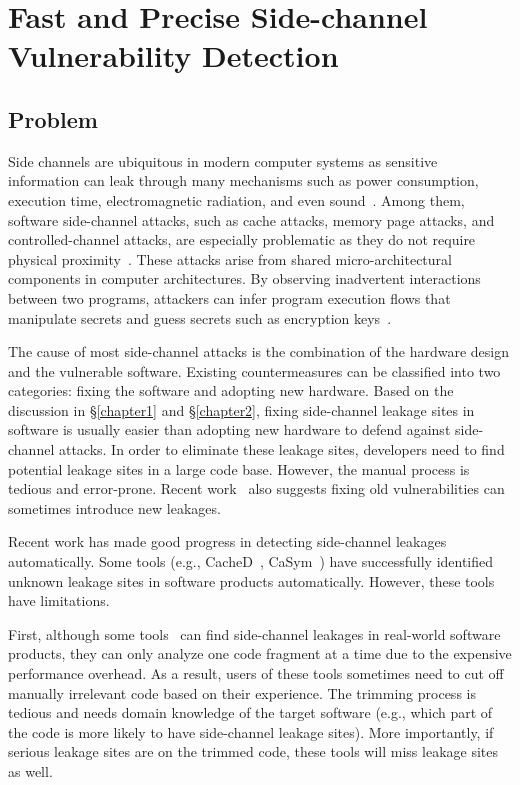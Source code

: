 
\chapter{Fast and Precise Side-channel Vulnerability Detection}\label{chapter3}
\section{Problem}
Side channels are ubiquitous in modern computer systems as sensitive information can leak through many mechanisms such as power consumption, execution time, electromagnetic radiation, and even sound~\cite{agrawal2002side,kar20178,chari1999towards,217605,genkin2014rsa}.  Among them, software side-channel attacks, such as cache attacks, memory page attacks, and controlled-channel attacks, are especially problematic as they do not require physical proximity~\cite{7163052,217543,217589,lee2017inferring,191010,liu2015last}. These attacks arise from shared micro-architectural components in computer architectures. By observing inadvertent interactions between two programs, attackers can infer program execution flows that manipulate secrets and guess secrets such as encryption keys~\cite{Osvik2006,Gullasch:2011:CGB:2006077.2006784,203878,10.1007/978-3-540-45238-6_6}.

The cause of most side-channel attacks is the combination of the hardware design and the vulnerable software. Existing countermeasures can be classified into two categories: fixing the software and adopting new hardware. Based on the discussion in \S\ref{chapter1} and \S\ref{chapter2}, fixing side-channel leakage sites in software is usually easier than adopting new hardware to defend against side-channel attacks. In order to eliminate these leakage sites, developers need to find potential leakage sites in a large code base. However, the manual process is tedious and error-prone. Recent work~\cite{203878} also suggests fixing old vulnerabilities can sometimes introduce new leakages.

Recent work has made good progress in detecting side-channel leakages automatically. Some tools (e.g., CacheD~\cite{203878}, CaSym~\cite{Brotzman19Casym}) have successfully identified unknown leakage sites in software products automatically. However, these tools have limitations.

First, although some tools~\cite{Brotzman19Casym} can find side-channel leakages in real-world software products, they can only analyze one code fragment at a time due to the expensive performance overhead. As a result, users of these tools sometimes need to cut off manually irrelevant code based on their experience. The trimming process is tedious and needs domain knowledge of the target software (e.g., which part of the code is more likely to have side-channel leakage sites). More importantly, if serious leakage sites are on the trimmed code, these tools will miss leakage sites as well.

